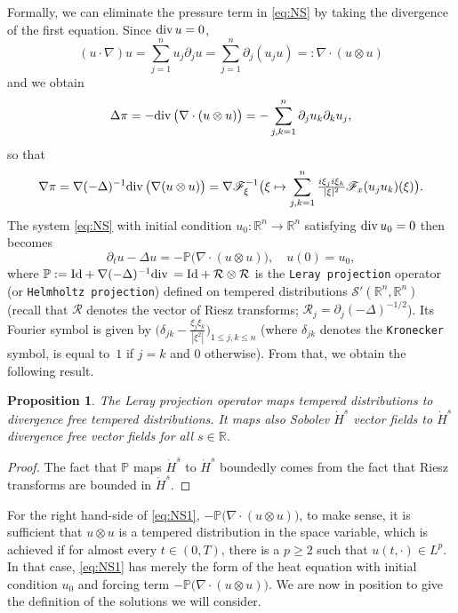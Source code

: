 \documentclass[a4paper, 12pt]{article}
\theoremstyle{plain}
\newtheorem{proposition}{Proposition}[section]
\theoremstyle{definition}
\theoremstyle{remark}
\numberwithin{equation}{section}
\begin{document}
Formally, we can eliminate the pressure term in \eqref{eq:NS} by taking the divergence of the
first equation. Since ${\rm div}\,u=0$, 
\[
(u\cdot\nabla)u=\sum_{j=1}^nu_j\partial_ju=\sum_{j=1}^n\partial_j(u_ju)=:\nabla\cdot(u\otimes u)
\]
and we obtain
\[
\Delta \pi=-{\rm div}\,\bigl(\nabla\cdot(u\otimes u)\bigr)=-\sum_{j,k=1}^n\partial_ju_k\partial_ku_j,
\]
so that 
\[
\nabla\pi=\nabla(-\Delta)^{-1}{\rm div}\,\bigl(\nabla(u\otimes u)\bigr)
=\nabla {\mathscr{F}}_\xi^{-1}\bigl(\xi\mapsto\sum_{j,k=1}^n\tfrac{i\xi_ji\xi_k}{|\xi|^2}{\mathscr{F}}_x(u_ju_k)(\xi)\bigr).
\] 
The system \eqref{eq:NS} with initial condition $u_0:{\mathds{R}}^n\to{\mathds{R}}^n$ 
satisfying ${\rm div}\,u_0=0$ then becomes
%
\begin{equation}
\label{eq:NS1}
\partial_tu-\Delta u=-{\mathbb{P}}\bigl(\nabla\cdot(u\otimes u)\bigr),\quad u(0)=u_0,
\end{equation}
%
where 
${\mathbb{P}}:={\rm Id}+\nabla(-\Delta)^{-1}{\rm div}\,={\rm Id}+{\mathcal{R}}\otimes{\mathcal{R}}$ 
is the {\tt Leray projection} operator (or {\tt Helmholtz projection}) defined on tempered 
distributions ${\mathscr{S}}'({\mathds{R}}^n,{\mathds{R}}^n)$ (recall that ${\mathcal{R}}$ denotes the vector
of Riesz transforms; ${\mathcal{R}}_j=\partial_j(-\Delta)^{-1/2}$). Its Fourier symbol is given by 
$\bigl(\delta_{jk}-\frac{\xi_j\xi_k}{|\xi^2|}\bigr)_{1\le j,k\le n}$ (where $\delta_{jk}$ denotes the
{\tt Kronecker} symbol, is equal to~$1$ if $j=k$ and $0$ otherwise). From that, we obtain
the following result.

\begin{proposition}
\label{prop:LerayR3}
The Leray projection operator maps tempered distributions to divergence free tempered distributions. 
It maps also Sobolev $\dot H^s$ vector fields to $\dot H^s$ divergence free vector fields for all
$s\in{\mathds{R}}$.
\end{proposition}

\begin{proof}
The fact that ${\mathbb{P}}$ maps $\dot H^s$ to $\dot H^s$ boundedly comes from the fact
that Riesz transforms are bounded in $\dot H^s$.
\end{proof}

For the right hand-side of \eqref{eq:NS1},
$-{\mathbb{P}}\bigl(\nabla\cdot(u\otimes u)\bigr)$, to make sense, it is sufficient that $u\otimes u$ is
a tempered distribution in the space variable, which is achieved if for almost every $t\in (0,T)$,
there is a $p\ge 2$ such that $u(t,\cdot)\in L^p$. In that case,
\eqref{eq:NS1} has merely the form of the heat equation with initial condition $u_0$ and
forcing term $-{\mathbb{P}}\bigl(\nabla\cdot(u\otimes u)\bigr)$. We are now in position to
give the definition of the solutions we will consider. 
\end{document}
